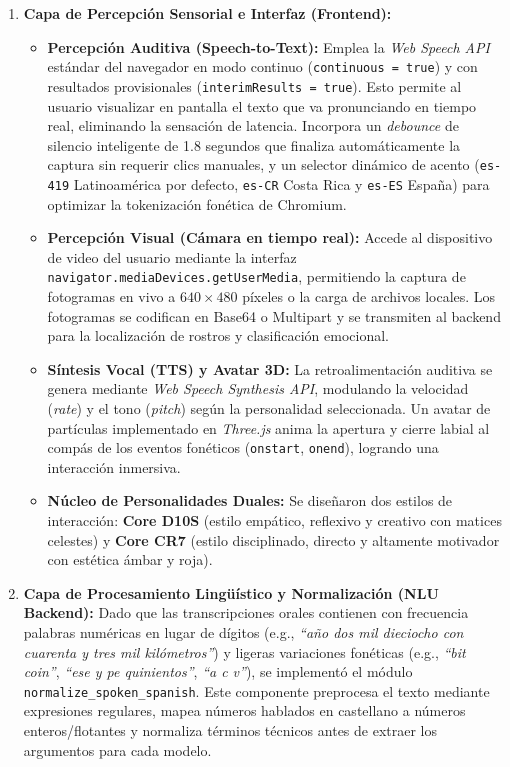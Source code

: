 \documentclass[12pt,letterpaper]{article}
\begin{document}
\begin{enumerate}[leftmargin=*]
    \item \textbf{Capa de Percepción Sensorial e Interfaz (Frontend):}
    \begin{itemize}
        \item \textbf{Percepción Auditiva (Speech-to-Text):} Emplea la \textit{Web Speech API} estándar del navegador en modo continuo (\texttt{continuous = true}) y con resultados provisionales (\texttt{interimResults = true}). Esto permite al usuario visualizar en pantalla el texto que va pronunciando en tiempo real, eliminando la sensación de latencia. Incorpora un \textit{debounce} de silencio inteligente de 1.8 segundos que finaliza automáticamente la captura sin requerir clics manuales, y un selector dinámico de acento (\texttt{es-419} Latinoamérica por defecto, \texttt{es-CR} Costa Rica y \texttt{es-ES} España) para optimizar la tokenización fonética de Chromium.
        \item \textbf{Percepción Visual (Cámara en tiempo real):} Accede al dispositivo de video del usuario mediante la interfaz \texttt{navigator.mediaDevices.getUserMedia}, permitiendo la captura de fotogramas en vivo a $640 \times 480$ píxeles o la carga de archivos locales. Los fotogramas se codifican en Base64 o Multipart y se transmiten al backend para la localización de rostros y clasificación emocional.
        \item \textbf{Síntesis Vocal (TTS) y Avatar 3D:} La retroalimentación auditiva se genera mediante \textit{Web Speech Synthesis API}, modulando la velocidad (\textit{rate}) y el tono (\textit{pitch}) según la personalidad seleccionada. Un avatar de partículas implementado en \textit{Three.js} anima la apertura y cierre labial al compás de los eventos fonéticos (\texttt{onstart}, \texttt{onend}), logrando una interacción inmersiva.
        \item \textbf{Núcleo de Personalidades Duales:} Se diseñaron dos estilos de interacción: \textbf{Core D10S} (estilo empático, reflexivo y creativo con matices celestes) y \textbf{Core CR7} (estilo disciplinado, directo y altamente motivador con estética ámbar y roja).
    \end{itemize}

    \item \textbf{Capa de Procesamiento Lingüístico y Normalización (NLU Backend):}
    Dado que las transcripciones orales contienen con frecuencia palabras numéricas en lugar de dígitos (e.g., \textit{``año dos mil dieciocho con cuarenta y tres mil kilómetros''}) y ligeras variaciones fonéticas (e.g., \textit{``bit coin''}, \textit{``ese y pe quinientos''}, \textit{``a c v''}), se implementó el módulo \texttt{normalize\_spoken\_spanish}. Este componente preprocesa el texto mediante expresiones regulares, mapea números hablados en castellano a números enteros/flotantes y normaliza términos técnicos antes de extraer los argumentos para cada modelo.


\end{enumerate}
\end{document}
